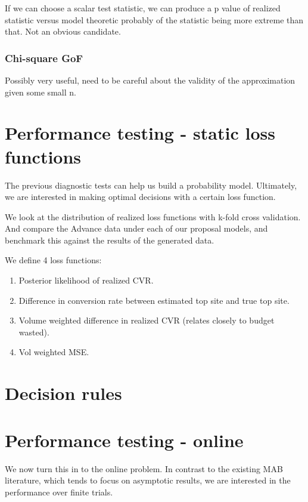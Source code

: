 \documentclass[12pt]{article}
\begin{document}
If we can choose a scalar test statistic, we can produce a p value of realized statistic versus model theoretic probably of the statistic being more extreme than that. Not an obvious candidate.

\subsubsection{Chi-square GoF}

Possibly very useful, need to be careful about the validity of the approximation given some small n.

\section{ Performance testing - static loss functions }

The previous diagnostic tests can help us build a probability model. Ultimately, we are interested in making optimal decisions with a certain loss function. 

We look at the distribution of realized loss functions with k-fold cross validation. And compare the Advance data under each of our proposal models, and benchmark this against the results of the generated data.

We define 4 loss functions:
\begin{enumerate}
	\item Posterior likelihood of realized CVR. 
	\item Difference in conversion rate between estimated top site and true top site.
	\item Volume weighted difference in realized CVR (relates closely to budget wasted). 
	\item Vol weighted MSE.
\end{enumerate}

\section{ Decision rules }

\section{ Performance testing - online }

We now turn this in to the online problem. In contrast to the existing MAB literature, which tends to focus on asymptotic results, we are interested in the performance over finite trials.
\end{document}
